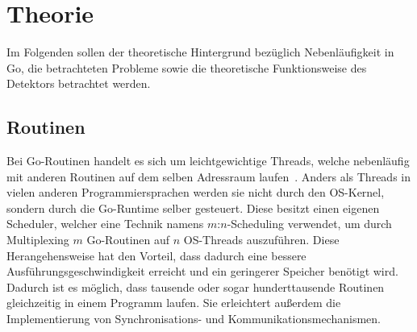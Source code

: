 \chapter{Theorie}\label{chap:background}
Im Folgenden sollen der theoretische Hintergrund bezüglich Nebenläufigkeit in Go, 
die betrachteten Probleme sowie die theoretische Funktionsweise des 
Detektors betrachtet werden. 

\section{Routinen}\label{Chap:Back-Sec:Routine}
Bei Go-Routinen handelt es sich um leichtgewichtige Threads, welche 
nebenläufig mit anderen Routinen auf dem selben Adressraum laufen~\cite{effectiveGo}.
Anders als Threads in vielen anderen Programmiersprachen werden sie nicht 
durch den OS-Kernel, sondern durch die Go-Runtime selber gesteuert.
Diese besitzt einen eigenen Scheduler, welcher eine Technik namens $m$:$n$-Scheduling 
verwendet, um durch Multiplexing $m$ Go-Routinen auf $n$ OS-Threads auszuführen.
Diese Herangehensweise hat den Vorteil, dass dadurch eine bessere Ausführungsgeschwindigkeit 
erreicht und ein geringerer Speicher benötigt wird. Dadurch ist 
es möglich, dass tausende oder sogar hunderttausende Routinen gleichzeitig 
in einem Programm laufen. Sie erleichtert außerdem 
die Implementierung von Synchronisations- und Kommunikationsmechanismen.

